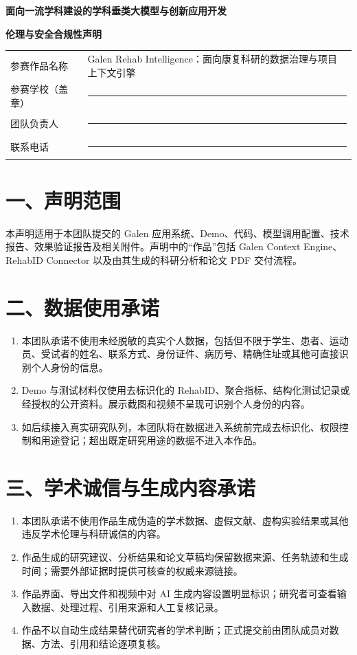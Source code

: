 \documentclass[12pt,a4paper]{article}
\begin{document}
\begin{center}
{\Large\bfseries 面向一流学科建设的学科垂类大模型与创新应用开发}\par
\vspace{0.5cm}
{\LARGE\bfseries 伦理与安全合规性声明}
\end{center}
\vspace{0.7cm}

\noindent\begin{tabularx}{\linewidth}{@{}p{3.4cm}Y@{}}
参赛作品名称 & Galen Rehab Intelligence：面向康复科研的数据治理与项目上下文引擎 \\
参赛学校（盖章） & \rule{10cm}{0.4pt} \\
团队负责人 & \rule{10cm}{0.4pt} \\
联系电话 & \rule{10cm}{0.4pt} \\
\bottomrule
\end{tabularx}

\section*{一、声明范围}
本声明适用于本团队提交的 Galen 应用系统、Demo、代码、模型调用配置、技术报告、效果验证报告及相关附件。声明中的“作品”包括 Galen Context Engine、RehabID Connector 以及由其生成的科研分析和论文 PDF 交付流程。

\section*{二、数据使用承诺}
\begin{enumerate}[leftmargin=2.4em,itemsep=0.65em]
\item 本团队承诺不使用未经脱敏的真实个人数据，包括但不限于学生、患者、运动员、受试者的姓名、联系方式、身份证件、病历号、精确住址或其他可直接识别个人身份的信息。
\item Demo 与测试材料仅使用去标识化的 RehabID、聚合指标、结构化测试记录或经授权的公开资料。展示截图和视频不呈现可识别个人身份的内容。
\item 如后续接入真实研究队列，本团队将在数据进入系统前完成去标识化、权限控制和用途登记；超出既定研究用途的数据不进入本作品。
\end{enumerate}

\section*{三、学术诚信与生成内容承诺}
\begin{enumerate}[leftmargin=2.4em,itemsep=0.65em]
\item 本团队承诺不使用作品生成伪造的学术数据、虚假文献、虚构实验结果或其他违反学术伦理与科研诚信的内容。
\item 作品生成的研究建议、分析结果和论文草稿均保留数据来源、任务轨迹和生成时间；需要外部证据时提供可核查的权威来源链接。
\item 作品界面、导出文件和视频中对 AI 生成内容设置明显标识；研究者可查看输入数据、处理过程、引用来源和人工复核记录。
\item 作品不以自动生成结果替代研究者的学术判断；正式提交前由团队成员对数据、方法、引用和结论逐项复核。
\end{enumerate}
\end{document}
